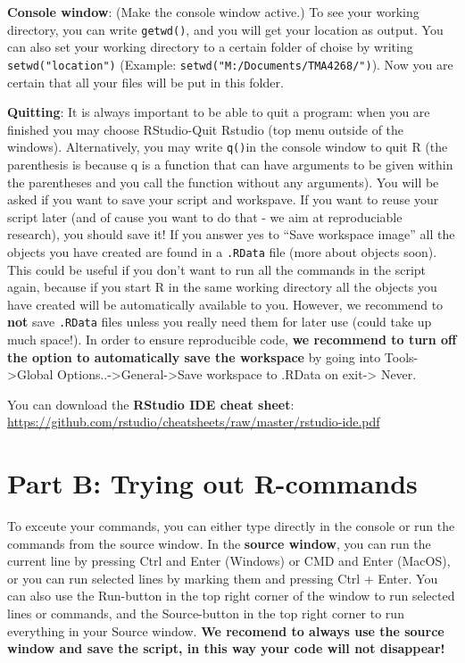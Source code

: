 \documentclass[]{article}
\begin{document}
\textbf{Console window}: (Make the console window active.) To see your
working directory, you can write \texttt{getwd()}, and you will get your
location as output. You can also set your working directory to a certain
folder of choise by writing \texttt{setwd("location")} (Example:
\texttt{setwd("M:/Documents/TMA4268/")}). Now you are certain that all
your files will be put in this folder.

\textbf{Quitting}: It is always important to be able to quit a program:
when you are finished you may choose RStudio-Quit Rstudio (top menu
outside of the windows). Alternatively, you may write \texttt{q()}in the
console window to quit R (the parenthesis is because q is a function
that can have arguments to be given within the parentheses and you call
the function without any arguments). You will be asked if you want to
save your script and workspave. If you want to reuse your script later
(and of cause you want to do that - we aim at reproduciable research),
you should save it! If you answer yes to ``Save workspace image'' all
the objects you have created are found in a \texttt{.RData} file (more
about objects soon). This could be useful if you don't want to run all
the commands in the script again, because if you start R in the same
working directory all the objects you have created will be automatically
available to you. However, we recommend to \textbf{not} save
\texttt{.RData} files unless you really need them for later use (could
take up much space!). In order to ensure reproducible code, \textbf{we
recommend to turn off the option to automatically save the workspace} by
going into Tools-\textgreater{}Global
Options..-\textgreater{}General-\textgreater{}Save workspace to .RData
on exit-\textgreater{} Never.

You can download the \textbf{RStudio IDE cheat sheet}:
\url{https://github.com/rstudio/cheatsheets/raw/master/rstudio-ide.pdf}

\section{Part B: Trying out
R-commands}\label{part-b-trying-out-r-commands}

To exceute your commands, you can either type directly in the console or
run the commands from the source window. In the \textbf{source window},
you can run the current line by pressing Ctrl and Enter (Windows) or CMD
and Enter (MacOS), or you can run selected lines by marking them and
pressing Ctrl + Enter. You can also use the Run-button in the top right
corner of the window to run selected lines or commands, and the
Source-button in the top right corner to run everything in your Source
window. \textbf{We recomend to always use the source window and save the
script, in this way your code will not disappear!}
\end{document}
